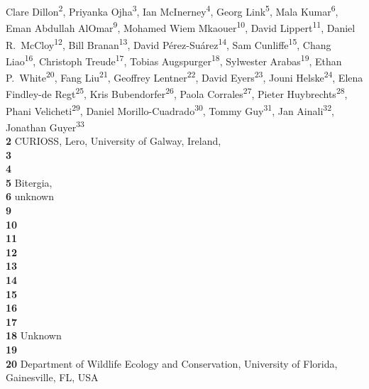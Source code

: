 Clare Dillon\textsuperscript{2},
Priyanka Ojha\textsuperscript{3},
Ian McInerney\textsuperscript{4},
Georg Link\textsuperscript{5},
Mala Kumar\textsuperscript{6},
Eman Abdullah AlOmar\textsuperscript{9},
Mohamed Wiem Mkaouer\textsuperscript{10},
David Lippert\textsuperscript{11},
Daniel R.\ McCloy\textsuperscript{12},
Bill Branan\textsuperscript{13},
David Pérez-Suárez\textsuperscript{14},
Sam Cunliffe\textsuperscript{15},
Chang Liao\textsuperscript{16},
Christoph Treude\textsuperscript{17},
Tobias Augspurger\textsuperscript{18},
Sylwester Arabas\textsuperscript{19},
Ethan P.\ White\textsuperscript{20},
Fang Liu\textsuperscript{21},
Geoffrey Lentner\textsuperscript{22},
David Eyers\textsuperscript{23},
Jouni Helske\textsuperscript{24},
Elena Findley-de Regt\textsuperscript{25},
Kris Bubendorfer\textsuperscript{26},
Paola Corrales\textsuperscript{27},
Pieter Huybrechts\textsuperscript{28},
Phani Velicheti\textsuperscript{29},
Daniel Morillo-Cuadrado\textsuperscript{30},
Tommy Guy\textsuperscript{31},
Jan Ainali\textsuperscript{32},
Jonathan Guyer\textsuperscript{33}
\\
\bigskip
\textbf{2} CURIOSS, Lero, University of Galway, Ireland, \\
\textbf{3} \\
\textbf{4} \\
\textbf{5} Bitergia, \\
\textbf{6} unknown\\
\textbf{9} \\
\textbf{10} \\
\textbf{11} \\
\textbf{12} \\
\textbf{13} \\
\textbf{14} \\
\textbf{15} \\
\textbf{16} \\
\textbf{17} \\
\textbf{18} Unknown\\
\textbf{19} \\
\textbf{20} Department of Wildlife Ecology and Conservation, University of Florida, Gainesville, FL, USA \\
